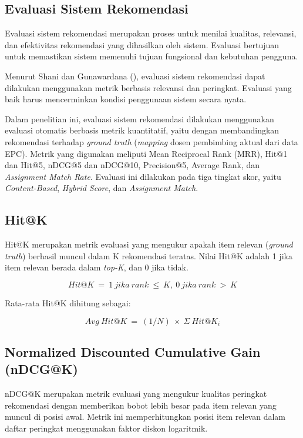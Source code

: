 \subsection{Evaluasi Sistem Rekomendasi}\label{evaluasi-sistem-rekomendasi}

Evaluasi sistem rekomendasi merupakan proses untuk menilai kualitas, relevansi, dan efektivitas rekomendasi yang dihasilkan oleh sistem. Evaluasi bertujuan untuk memastikan sistem memenuhi tujuan fungsional dan kebutuhan pengguna.

Menurut Shani dan Gunawardana (\citeyear{shani2011evaluating}), evaluasi sistem rekomendasi dapat dilakukan menggunakan metrik berbasis relevansi dan peringkat. Evaluasi yang baik harus mencerminkan kondisi penggunaan sistem secara nyata.

Dalam penelitian ini, evaluasi sistem rekomendasi dilakukan menggunakan evaluasi otomatis berbasis metrik kuantitatif, yaitu dengan membandingkan rekomendasi terhadap \textit{ground truth} (\textit{mapping} dosen pembimbing aktual dari data EPC). Metrik yang digunakan meliputi Mean Reciprocal Rank (MRR), Hit@1 dan Hit@5, nDCG@5 dan nDCG@10, Precision@5, Average Rank, dan \textit{Assignment Match Rate}. Evaluasi ini dilakukan pada tiga tingkat skor, yaitu \textit{Content-Based}, \textit{Hybrid Score}, dan \textit{Assignment Match}.

\subsection{Hit@K}\label{hitk}

Hit@K merupakan metrik evaluasi yang mengukur apakah item relevan (\textit{ground truth}) berhasil muncul dalam K rekomendasi teratas. Nilai Hit@K adalah 1 jika item relevan berada dalam \textit{top-K}, dan 0 jika tidak.

\[Hit@K\  = \ 1\ jika\ rank\  \leq \ K,\ 0\ jika\ rank\  > \ K\]

Rata-rata Hit@K dihitung sebagai:

\[Avg\ Hit@K\  = \ (1/N)\  \times \ \Sigma\ Hit@K_i\]

\subsection{Normalized Discounted Cumulative Gain (nDCG@K)}\label{normalized-discounted-cumulative-gain-ndcgk}

nDCG@K merupakan metrik evaluasi yang mengukur kualitas peringkat rekomendasi dengan memberikan bobot lebih besar pada item relevan yang muncul di posisi awal. Metrik ini memperhitungkan posisi item relevan dalam daftar peringkat menggunakan faktor diskon logaritmik.

